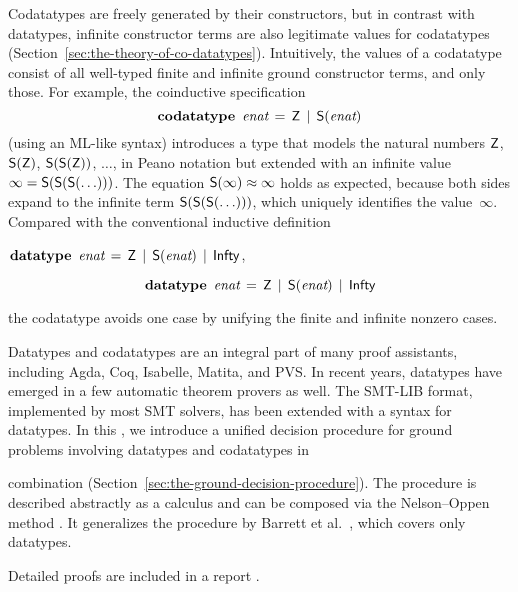Codatatypes are freely generated by their constructors, but in contrast with datatypes,
infinit\-e constructor terms are also legitimate values for codatatypes
(Section~\ref{sec:the-theory-of-co-datatypes}). Intuitively, the
values of a codatatype consist of all well-typed finite and infinite ground
constructor
terms, and only those. For example, the coinductive specification
%
\[\textbf{codatatype}~\,\textit{enat} \,=\, \textsf{Z} \,\mid\, \textsf{S}(\textit{enat})\]
%
(using an ML-like syntax) introduces a type that
models the natural numbers $\textsf{Z}$, $\textsf{S}(\textsf{Z})$, $\textsf{S}(\textsf{S}(\textsf{Z}))$, $\ldots$\afterLdots{},
in Peano notation but extended with an
infinite value $\infty = \textsf{S}(\textsf{S}(\textsf{S}(\ldots)))$.
The equation $\textsf{S}(\infty) \approx \infty$ holds as expected,
because both sides expand to the infinite term
$\textsf{S}(\textsf{S}(\textsf{S}(\ldots)))$, which uniquely identifies the
value~$\infty$.
Compared with the conventional inductive definition
\begin{conf}$\vthinspace \keyw{datatype}~\,\ty{enat} \,=\, \const{Z} \,\mid\, \const{S}(\ty{enat}) \,\mid\, \const{Infty}$, \end{conf}%
\begin{rep}\[\vthinspace \keyw{datatype}~\,\ty{enat} \,=\, \const{Z} \,\mid\, \const{S}(\ty{enat}) \,\mid\, \const{Infty}\]\end{rep}%
the codatatype avoids
one case by unifying the finite and infinite nonzero cases.

Datatypes and codatatypes are an integral part of many proof assistants,
including Agda, Coq, Isabelle, Matita, and PVS. In recent years, datatypes
have emerged in a few automatic theorem provers as well. The SMT-LIB
format, implemented by most SMT
solvers, has been extended with a syntax for datatypes.
In this \thewordpaper, we introduce a unified decision procedure for ground
problems involving datatypes and codatatypes in
\begin{conf}\goodbreak\noindent\end{conf}%
combination (Section~\ref{sec:the-ground-decision-procedure}).
The procedure is described abstractly as a calculus and can be
composed via the Nelson--Oppen method \cite{nelson-oppen-1979}.
It generalizes the procedure by Barrett et al.\ \cite{barrett-et-al-2007}, which covers
only datatypes.
\begin{conf}
Detailed proofs %
are included in a %
report
\cite{our-report}.
\end{conf}%


